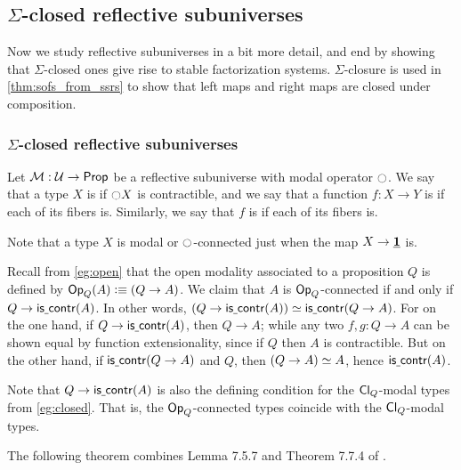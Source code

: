 \subsection{\texorpdfstring{$\Sigma$}{Σ}-closed reflective subuniverses}
\label{sec:ssrs}

Now we study reflective subuniverses in a bit more detail, and end by
showing that $\Sigma$-closed ones give rise to stable factorization
systems. $\Sigma$-closure is used in \autoref{thm:sofs_from_ssrs} to
show that left maps and right maps are closed under composition.



\subsubsection{\texorpdfstring{$\Sigma$}{Σ}-closed reflective subuniverses}
\label{sec:sigma-closed}

\begin{defn}\label{defn:connected}
Let $\mathcal{M}:\mathcal{U}\to\mathsf{Prop}$ be a reflective subuniverse with modal
operator ${\ocircle}$. We say
that a type $X$ is  if ${\ocircle} X$ is contractible,
and we say that a function $f:X\to Y$ is  if each
of its fibers is. Similarly, we say that $f$ is  if each of its
fibers is.
\end{defn}

Note that a type $X$ is modal or ${\ocircle}$-connected just when the map $X\to\underline{\mathbf{1}}$ is.

\begin{eg}\label{eg:closed-connected}
  Recall from \cref{eg:open} that the open modality associated to a proposition $Q$ is defined by $\mathsf{Op}_{Q}(A) \vcentcolon\equiv (Q\to A)$.
  We claim that $A$ is $\mathsf{Op}_{Q}$-connected if and only if $Q \to\mathsf{is\underline{\ }{}contr}(A)$.
  In other words, $(Q \to\mathsf{is\underline{\ }{}contr}(A))\simeq \mathsf{is\underline{\ }{}contr}(Q\to A)$.
  For on the one hand, if $Q\to \mathsf{is\underline{\ }{}contr}(A)$, then $Q\to A$; while any two $f,g:Q\to A$ can be shown equal by function extensionality, since if $Q$ then $A$ is contractible.
  But on the other hand, if $\mathsf{is\underline{\ }{}contr}(Q\to A)$ and $Q$, then $\eqv{(Q\to A)}{A}$, hence $\mathsf{is\underline{\ }{}contr}(A)$.

  Note that $Q \to\mathsf{is\underline{\ }{}contr}(A)$ is also the defining condition for the $\mathsf{Cl}_{Q}$-modal types from \cref{eg:closed}.
  That is, the $\mathsf{Op}_{Q}$-connected types coincide with the $\mathsf{Cl}_{Q}$-modal types.
\end{eg}

The following theorem combines Lemma 7.5.7 and Theorem 7.7.4 of \cite{hottbook}.

